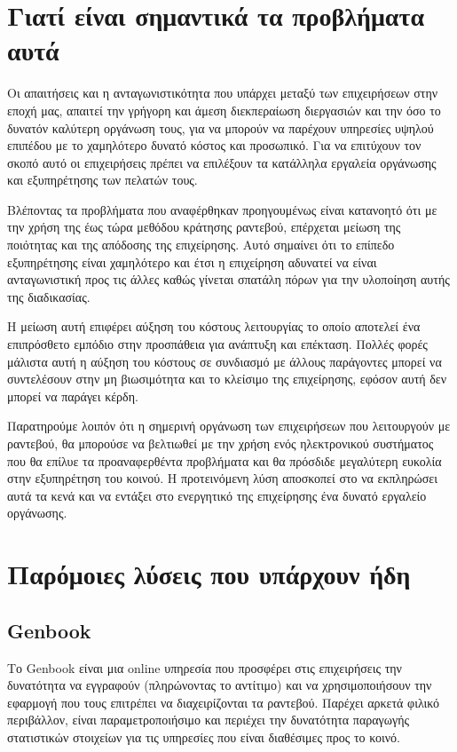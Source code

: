 \section {Γιατί είναι σημαντικά τα προβλήματα αυτά}
Οι απαιτήσεις και η ανταγωνιστικότητα που υπάρχει μεταξύ των επιχειρήσεων στην εποχή μας, απαιτεί την γρήγορη και άμεση διεκπεραίωση διεργασιών και την όσο το δυνατόν καλύτερη οργάνωση τους, για να μπορούν να παρέχουν υπηρεσίες υψηλού επιπέδου με το χαμηλότερο δυνατό κόστος και προσωπικό. Για να επιτύχουν τον σκοπό αυτό οι επιχειρήσεις πρέπει να επιλέξουν τα κατάλληλα εργαλεία οργάνωσης και εξυπηρέτησης των πελατών τους.

Βλέποντας τα προβλήματα που αναφέρθηκαν προηγουμένως είναι κατανοητό ότι με την χρήση της έως τώρα μεθόδου κράτησης ραντεβού, επέρχεται μείωση της ποιότητας και της απόδοσης της επιχείρησης. Αυτό σημαίνει ότι το επίπεδο εξυπηρέτησης είναι χαμηλότερο και έτσι η επιχείρηση αδυνατεί να είναι ανταγωνιστική προς τις άλλες καθώς γίνεται σπατάλη πόρων για την υλοποίηση αυτής της διαδικασίας.

Η μείωση αυτή επιφέρει αύξηση του κόστους λειτουργίας το οποίο αποτελεί ένα επιπρόσθετο εμπόδιο στην προσπάθεια για ανάπτυξη και επέκταση. Πολλές φορές μάλιστα αυτή η αύξηση του κόστους σε συνδιασμό με άλλους παράγοντες μπορεί να συντελέσουν στην μη βιωσιμότητα και το κλείσιμο της επιχείρησης, εφόσον αυτή δεν μπορεί να παράγει κέρδη.

Παρατηρούμε λοιπόν ότι η σημερινή οργάνωση των επιχειρήσεων που λειτουργούν με ραντεβού, θα μπορούσε να βελτιωθεί με την χρήση ενός ηλεκτρονικού συστήματος που θα επίλυε τα προαναφερθέντα προβλήματα και θα πρόσδιδε μεγαλύτερη ευκολία στην εξυπηρέτηση του κοινού. Η προτεινόμενη λύση αποσκοπεί στο να εκπληρώσει αυτά τα κενά και να εντάξει στο ενεργητικό της επιχείρησης ένα δυνατό εργαλείο οργάνωσης.

\section{Παρόμοιες λύσεις που υπάρχουν ήδη}
\subsection{Genbook}
Το Genbook είναι μια online υπηρεσία που προσφέρει στις επιχειρήσεις την δυνατότητα να εγγραφούν (πληρώνοντας το αντίτιμο) και να χρησιμοποιήσουν την εφαρμογή που τους επιτρέπει να διαχειρίζονται τα ραντεβού. Παρέχει αρκετά φιλικό περιβάλλον, είναι παραμετροποιήσιμο και περιέχει την δυνατότητα παραγωγής στατιστικών στοιχείων για τις υπηρεσίες που είναι διαθέσιμες προς το κοινό. 

